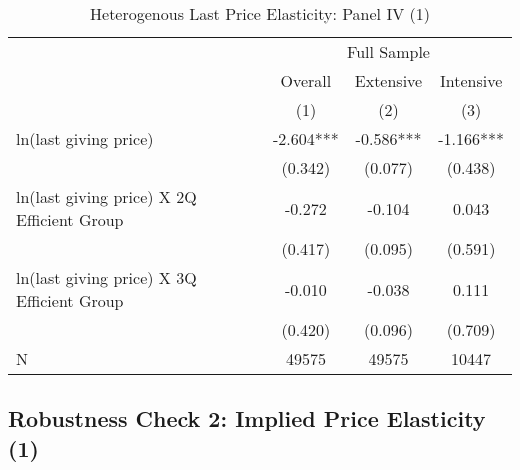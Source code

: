 \documentclass[ review  , 3p ]{elsarticle}
\begin{document}
  \begin{table}

  \caption{\label{tab:kableHeteroLastElasticitySlide1}Heterogenous Last Price Elasticity: Panel IV (1)}
  \centering
  \fontsize{8}{10}\selectfont
  \begin{tabular}[t]{lccc}
  \toprule
  \multicolumn{1}{c}{ } & \multicolumn{3}{c}{Full Sample} \\
  \cmidrule(l{3pt}r{3pt}){2-4}
  \multicolumn{1}{c}{ } & \multicolumn{1}{c}{Overall} & \multicolumn{1}{c}{Extensive} & \multicolumn{1}{c}{Intensive} \\
  \cmidrule(l{3pt}r{3pt}){2-2} \cmidrule(l{3pt}r{3pt}){3-3} \cmidrule(l{3pt}r{3pt}){4-4}
   & (1) & (2) & (3)\\
  \midrule
  ln(last giving price) & -2.604*** & -0.586*** & -1.166***\\
   & (0.342) & (0.077) & (0.438)\\
  ln(last giving price) X 2Q Efficient Group & -0.272 & -0.104 & 0.043\\
   & (0.417) & (0.095) & (0.591)\\
  ln(last giving price) X 3Q Efficient Group & -0.010 & -0.038 & 0.111\\
   & (0.420) & (0.096) & (0.709)\\
  N & 49575 & 49575 & 10447\\
  \bottomrule
  \end{tabular}
  \end{table}

  \hypertarget{robustness-check-2-implied-price-elasticity-1}{%
  \subsection{Robustness Check 2: Implied Price Elasticity (1)}\label{robustness-check-2-implied-price-elasticity-1}}
\end{document}
